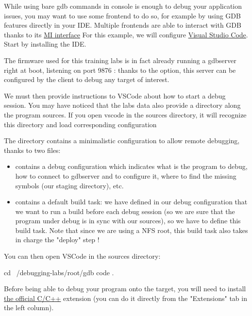 While using bare gdb commands in console is enough to debug your application issues, you
may want to use some frontend to do so, for example by using GDB features directly
in your IDE. Multiple frontends are able to interact with GDB thanks to its
\href{https://sourceware.org/gdb/current/onlinedocs/gdb.html/GDB_002fMI.html}{MI
interface}
For this example, we will configure
\href{https://code.visualstudio.com/}{Visual Studio Code}. Start by installing
the IDE.

The firmware used for this training labs is in fact already running a gdbserver
right at boot, listening on port 9876 : thanks to the  option,
this server can be configured by the client to debug any target of interest.

We must then provide instructions to VSCode about how to start a debug session.
You may have noticed that the labs data also provide a  directory
along the program sources. If you open vscode in the sources directory, it will
recognize this  directory and load corresponding configuration

The  directory contains a minimalistic configuration to allow
remote debugging, thanks to two files:
\begin{itemize}
  \item {} contains a debug configuration which indicates what
  is the program to debug, how to connect to gdbserver and to configure it, where to
  find the missing symbols (our staging directory), etc.
  \item {} contains a default build task: we have defined in our
  debug configuration that we want to run a build before each debug session (so
  we are sure that the program under debug is in sync with our sources), so
  we have to define this build task. Note that since we are using a NFS root,
  this build task also takes in charge the "deploy" step !
\end{itemize}

You can then open VSCode in the sources directory:
\begin{bashinput}
  cd ~/debugging-labs/root/gdb
  code .
\end{bashinput}
Before being able to debug your program onto the target, you will need to install
\href{https://marketplace.visualstudio.com/items?itemName=ms-vscode.cpptools}{the
official C/C++} extension (you can do it directly from the "Extensions" tab in
the left column).

